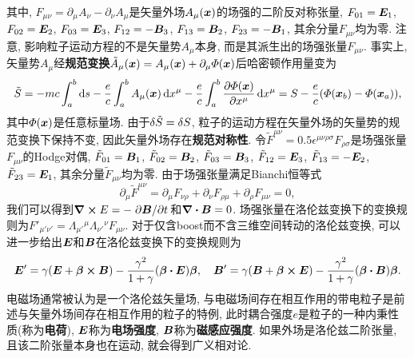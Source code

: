 其中, $ F_{\mu\nu}=\partial_{\mu}A_{\nu} - \partial_{\nu}A_{\mu} $是矢量外场$ A_{\mu} (\vb*{x}) $的场强的二阶反对称张量, $ F_{01}=\vb*{E}_1 $, $ F_{02}=\vb*{E}_2 $, $ F_{03}=\vb*{E}_3 $, $ F_{12}=-\vb*{B}_3 $, $ F_{13}=\vb*{B}_2 $, $ F_{23}=-\vb*{B}_1 $, 其余分量$ F_{\mu\nu} $均为零. 注意, 影响粒子运动方程的不是矢量势$ A_{\mu} $本身, 而是其派生出的场强张量$ F_{\mu\nu} $. 事实上, 矢量势$ A_{\mu} $经\textbf{规范变换}$ \tilde{A}_{\mu}(\vb*{x}) = A_{\mu}(\vb*{x}) + \partial_{\mu} \varPhi(\vb*{x}) $后哈密顿作用量变为
\begin{equation*}
    \tilde{S} = -mc \int_a^b \dd{s} - \frac{e}{c} \int_a^b A_{\mu} (\vb*{x}) \dd{x^{\mu}} - \frac{e}{c} \int_a^b \pdv{\varPhi(\vb*{x})}{x^{\mu}} \dd{x^{\mu}} = S - \frac{e}{c} (\varPhi(\vb*{x}_b) - \varPhi(\vb*{x}_a)),
\end{equation*}
其中$ \varPhi(\vb*{x}) $是任意标量场. 由于$ \var{\tilde{S}} = \var{S} $, 粒子的运动方程在矢量外场的矢量势的规范变换下保持不变, 因此矢量外场存在\textbf{规范对称性}. 令$ \tilde{F}^{\mu\nu} = 0.5 \epsilon^{\mu\nu\rho\sigma} F_{\rho\sigma} $是场强张量$ F_{\mu\nu} $的Hodge对偶, $ \tilde{F}_{01}=\vb*{B}_1 $, $ \tilde{F}_{02}=\vb*{B}_2 $, $ \tilde{F}_{03}=\vb*{B}_3 $, $ \tilde{F}_{12}=\vb*{E}_3 $, $ \tilde{F}_{13}=-\vb*{E}_2 $, $ \tilde{F}_{23}=\vb*{E}_1 $, 其余分量$ \tilde{F}_{\mu\nu} $均为零. 由于场强张量满足Bianchi恒等式
\begin{equation*}
    \partial_{\mu} \tilde{F}^{\mu\nu} = \partial_{\mu}F_{\nu\rho} + \partial_{\nu}F_{\rho\mu} + \partial_{\rho}F_{\mu\nu} = 0,
\end{equation*}
我们可以得到$ \curl{E} = - \pdv*{\vb*{B}}{t} $和$ \div{\vb*{B}} = 0 $. 场强张量在洛伦兹变换下的变换规则为$ F'_{\mu'\nu'} = \varLambda_{\mu'}{}^{\mu} \varLambda_{\nu'}{}^{\nu} F_{\mu\nu} $. 对于仅含boost而不含三维空间转动的洛伦兹变换, 可以进一步给出$ \vb*{E} $和$ \vb*{B} $在洛伦兹变换下的变换规则为
\begin{equation*}
    \vb*{E}' = \gamma (\vb*{E} + \vb*{\beta} \cross \vb*{B}) - \frac{\gamma^2}{1+\gamma} (\vb*{\beta} \vdot \vb*{E}) \vb*{\beta}, \quad \vb*{B}' = \gamma (\vb*{B} + \vb*{\beta} \cross \vb*{E}) - \frac{\gamma^2}{1+\gamma} (\vb*{\beta} \vdot \vb*{B}) \vb*{\beta}.
\end{equation*}
电磁场通常被认为是一个洛伦兹矢量场, 与电磁场间存在相互作用的带电粒子是前述与矢量外场间存在相互作用的粒子的特例, 此时耦合强度$ e $是粒子的一种内秉性质(称为\textbf{电荷}), $ \vb*{E} $称为\textbf{电场强度}, $ \vb*{B} $称为\textbf{磁感应强度}. 如果外场是洛伦兹二阶张量, 且该二阶张量本身也在运动, 就会得到广义相对论.
\newpage
